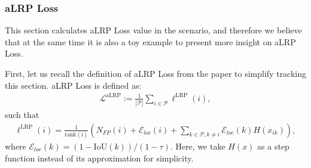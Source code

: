 \documentclass{article}
\begin{document}
\subsubsection{aLRP Loss}
This section calculates aLRP Loss value in the scenario, and therefore we believe that at the same time it is also a toy example to present more insight on aLRP Loss.

 First, let us recall the definition of aLRP Loss from the paper to simplify tracking this section. aLRP Loss is defined as:
\begin{align}
    \mathcal{L}^\mathrm{aLRP}:=\frac{1}{|\mathcal{P}|}\sum \limits_{i \in \mathcal{P}} \ell^{\mathrm{LRP}}(i),
\end{align}
such that
\begin{align}
\label{eq:LRPReformulation1}
    \ell^{\mathrm{LRP}}(i) 
    = \frac{1}{\mathrm{rank(i)}}
    \left(N_{FP}(i) + \mathcal{E}_{loc}(i) +  \sum \limits_{k \in \mathcal{P}, k \neq i}  \mathcal{E}_{loc}(k) H(x_{ik}) \right),
\end{align}
where $\mathcal{E}_{loc}(k) = (1-\mathrm{IoU}(k))/(1-\tau)$. Here, we take $H(x)$ as a step function instead of its approximation for simplicity.
\end{document}
